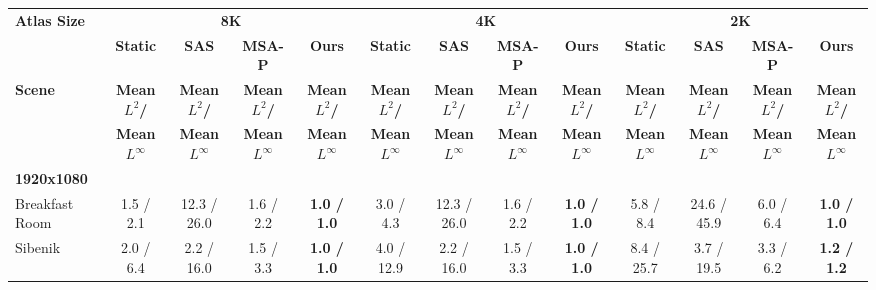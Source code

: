 \begin{table*}[t]
	\scriptsize
	\setlength{\tabcolsep}{3pt}
	\centering
	\begin{tabular}{l cccc|cccc|cccc}
		\textbf{Atlas   Size} & \multicolumn{4}{c|}{\textbf{8K}}                                                                    & \multicolumn{4}{c|}{\textbf{4K}}                                                                    & \multicolumn{4}{c}{\textbf{2K}}                                                                    \\
		& \textbf{Static}      & \textbf{SAS}         & \textbf{MSA-P}       & \textbf{Ours}        & \textbf{Static}      & \textbf{SAS}         & \textbf{MSA-P}       & \textbf{Ours}        & \textbf{Static}      & \textbf{SAS}         & \textbf{MSA-P}       & \textbf{Ours}        \\
		 \textbf{Scene} & \textbf{Mean $L^2$/}   & \textbf{Mean $L^2$/}   & \textbf{Mean $L^2$/}   & \textbf{Mean $L^2$/}   & \textbf{Mean $L^2$/}   & \textbf{Mean $L^2$/}   & \textbf{Mean $L^2$/}   & \textbf{Mean $L^2$/}   & \textbf{Mean $L^2$/}   & \textbf{Mean $L^2$/}   & \textbf{Mean $L^2$/}   & \textbf{Mean $L^2$/}   \\
		& \textbf{Mean $L^\infty$} & \textbf{Mean $L^\infty$} & \textbf{Mean $L^\infty$} & \textbf{Mean $L^\infty$} & \textbf{Mean $L^\infty$} & \textbf{Mean $L^\infty$} & \textbf{Mean $L^\infty$} & \textbf{Mean $L^\infty$} & \textbf{Mean $L^\infty$} & \textbf{Mean $L^\infty$} & \textbf{Mean $L^\infty$} & \textbf{Mean $L^\infty$} \\
		\hline
		\textbf{1920x1080}            & \textbf{}            & \textbf{}            & \textbf{}            & \textbf{}            & \textbf{}            & \textbf{}            & \textbf{}            &                      &                      &                      &                      &                      \\
		Breakfast Room                & 1.5 / 2.1            & 12.3 / 26.0          & 1.6 / 2.2            & \textbf{1.0 / 1.0}   & 3.0 / 4.3            & 12.3 / 26.0          & 1.6 / 2.2            & \textbf{1.0 / 1.0}   & 5.8 / 8.4            & 24.6 / 45.9          & 6.0 / 6.4            & \textbf{1.0 / 1.0}   \\
		Sibenik                       & 2.0 / 6.4            & 2.2 / 16.0           & 1.5 / 3.3            & \textbf{1.0 / 1.0}   & 4.0 / 12.9           & 2.2 / 16.0           & 1.5 / 3.3            & \textbf{1.0 / 1.0}   & 8.4 / 25.7           & 3.7 / 19.5           & 3.3 / 6.2            & \textbf{1.2 / 1.2}   \\

\end{tabular}
\end{table*}
